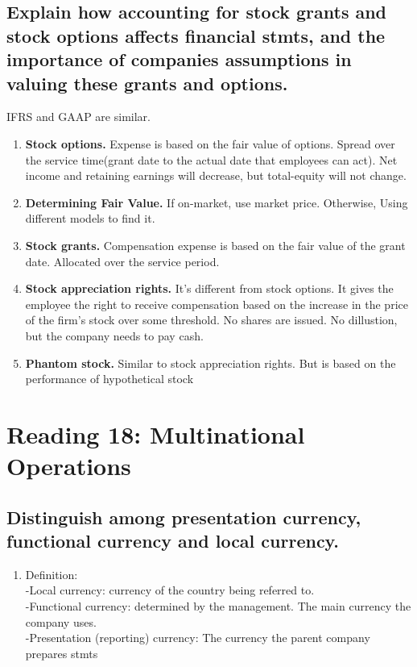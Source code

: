 \documentclass{article}
\newcommand{\be}{\begin{enumerate}}
\newcommand{\ee}{\end{enumerate}}
\begin{document}
\subsection{Explain how accounting for stock grants and stock options affects
financial stmts, and the importance of companies assumptions in valuing these grants
and options.}
IFRS and GAAP are similar.
\be
    \item {\bf Stock options.} Expense is based on the fair value of options. Spread over 
        the service time(grant date to the actual date that employees can act). Net income
        and retaining earnings will decrease, but total-equity will not change.
    \item {\bf Determining Fair Value.} If on-market, use market price.
        Otherwise, Using different models to find it.
    \item {\bf Stock grants.} Compensation expense is based on the fair value of
        the grant date. Allocated over the service period.
    \item {\bf Stock appreciation rights.} It's different from stock options. 
        It gives the employee the right to receive compensation based on the increase in the price
        of the firm's stock over some threshold. No shares are issued. No dillustion, but 
        the company needs to pay cash.
    \item {\bf Phantom stock.} Similar to stock appreciation rights. But is based on the 
        performance of hypothetical stock
\ee


\section{Reading 18: Multinational Operations}
\subsection{Distinguish among presentation currency, functional currency and local currency.}
\be
    \item Definition:
        \\-Local currency: currency of the country being referred to.
        \\-Functional currency: determined by the management. The main currency the company uses.
        \\-Presentation (reporting) currency: The currency the parent company prepares stmts
\ee
\end{document}
